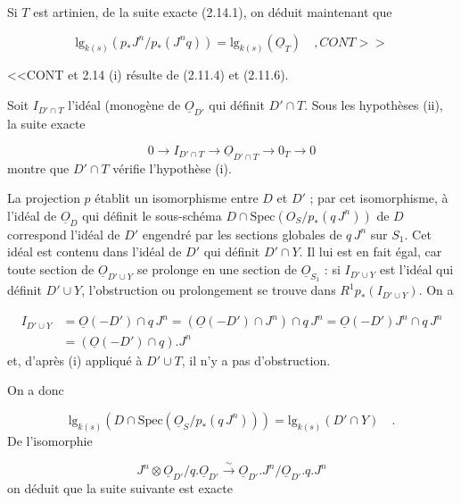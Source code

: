 Si $T$ est artinien, de la suite exacte (2.14.1), on déduit maintenant que

\begin{equation*}
\mathrm{lg}_{k(s)} (p_*J^n/p_*(J^nq)) = \mathrm{lg}_{k(s)} (\underline{O}_T) \quad , CONT>>
\end{equation*}


<<CONT et 2.14 (i) résulte de (2.11.4) et (2.11.6).

Soit $I_{D'\cap T}$ l'idéal (monogène de $\underline{O}_{D'}$ qui définit $D'\cap T$. Sous les hypothèses (ii), la suite exacte

\begin{equation*}
0 \longrightarrow I_{D'\cap T} \longrightarrow \underline{O}_{D'\cap T} \longrightarrow 0_T \longrightarrow 0
\end{equation*}
montre que $D'\cap T$ vérifie l'hypothèse (i).

La projection $p$ établit un isomorphisme entre $D$ et $D'$ ; par cet isomorphisme, à l'idéal de $\underline{O}_D$ qui définit le sous-schéma $D \cap \mathrm{Spec}(O_S/p_*(q\,J^n))$ de $D$ correspond l'idéal de $D'$ engendré par les sections globales de $q\,J^n$ sur $S_1$. Cet idéal est contenu dans l'idéal de $D'$ qui définit $D'\cap Y$. Il lui est en fait égal, car toute section de $\underline{O}_{D'\cup Y}$ se prolonge en une section de $\underline{O}_{S_1}$ : si $I_{D'\cup Y}$ est l'idéal qui définit $D'\cup Y$, l'obstruction ou prolongement se trouve dans $R^1p_*(I_{D'\cup Y})$. On a

\begin{equation*}
\begin{array}{rl} I_{D'\cup Y} & = \underline{O}(-D')\cap q\,J^n = (\underline{O}(-D')\cap J^n) \cap q\,J^n = \underline{O}(-D')J^n \cap q\,J^n \\[2mm] & = (\underline{O}(-D')\cap q). J^n \end{array}
\end{equation*}
et, d'après (i) appliqué à $D'\cup T$, il n'y a pas d'obstruction.

On a donc

\begin{equation}\tag{2.14.2}
\mathrm{lg}_{k(s)} (D\cap \mathrm{Spec}(\underline{O}_S/p_*(q\,J^n))) = \mathrm{lg}_{k(s)} (D'\cap Y) \quad .
\end{equation}
De l'isomorphie

\begin{equation*}
J^n \otimes \underline{O}_{D'}/q.\underline{O}_{D'} \stackrel{\sim}{\longrightarrow} \underline{O}_{D'}.J^n/\underline{O}_{D'}.q.J^n
\end{equation*}
on déduit que la suite suivante est exacte

